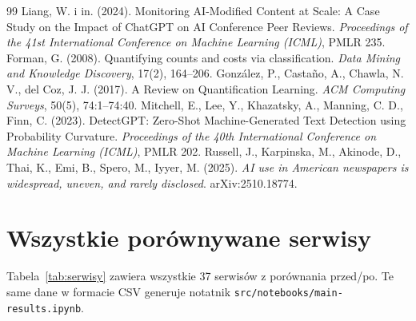 \documentclass[11pt,a4paper]{article}
\begin{document}
\begin{thebibliography}{99}
 Liang, W. i in. (2024). Monitoring AI-Modified Content at Scale: A Case Study on the Impact of ChatGPT on AI Conference Peer Reviews. \emph{Proceedings of the 41st International Conference on Machine Learning (ICML)}, PMLR 235.
 Forman, G. (2008). Quantifying counts and costs via classification. \emph{Data Mining and Knowledge Discovery}, 17(2), 164--206.
 González, P., Castaño, A., Chawla, N. V., del Coz, J. J. (2017). A Review on Quantification Learning. \emph{ACM Computing Surveys}, 50(5), 74:1--74:40.
 Mitchell, E., Lee, Y., Khazatsky, A., Manning, C. D., Finn, C. (2023). DetectGPT: Zero-Shot Machine-Generated Text Detection using Probability Curvature. \emph{Proceedings of the 40th International Conference on Machine Learning (ICML)}, PMLR 202.
 Russell, J., Karpinska, M., Akinode, D., Thai, K., Emi, B., Spero, M., Iyyer, M. (2025). \emph{AI use in American newspapers is widespread, uneven, and rarely disclosed}. arXiv:2510.18774.
\end{thebibliography}

\appendix
\section{Wszystkie porównywane serwisy}

Tabela~\ref{tab:serwisy} zawiera wszystkie 37 serwisów z porównania przed/po. Te same dane w formacie CSV generuje notatnik \texttt{src/notebooks/main-results.ipynb}.


\end{document}
